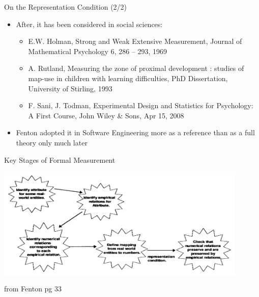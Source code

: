 \documentclass{beamer}
\begin{document}
\begin{frame}{\centerline{ On the Representation Condition (2/2)}}

\begin{itemize}
\item After, it has been considered in social sciences: 
\begin{itemize}
\item E.W. Holman, Strong and Weak Extensive Measurement, Journal of Mathematical Psychology 6, 286 -- 293, 1969
\item A. Rutland, Measuring the zone of proximal development : studies of map-use in children with learning difficulties, PhD Dissertation, University of Stirling, 1993
\item F. Sani, J. Todman, Experimental Design and Statistics for Psychology: A First Course, John Wiley \& Sons, Apr 15, 2008 
\end{itemize}
\item Fenton adopted it in Software Engineering more as a reference than as a full theory only much later
\end{itemize}


\end{frame}



\begin{frame}{\centerline{Key Stages of Formal Measurement}}
\begin{center}
\includegraphics[width=120mm]{A2022.IDSEPC.SperimentazioneDeduzione/img-img13.png}
\newline
\end{center}

\begin{small}
\begin{center}
from Fenton pg 33
\end{center}
\end{small}
\end{frame}
\end{document}

